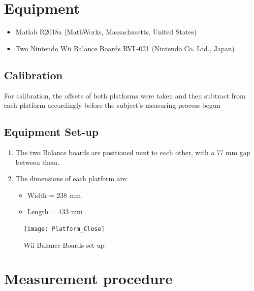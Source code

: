 \documentclass[twoside]{ctuthesis}
\theoremstyle{plain}
\theoremstyle{definition}
\theoremstyle{note}
\begin{document}
\section{Equipment}

\begin{itemize}
	\item Matlab R2018a (MathWorks, Massachusetts, United States)
	\item Two Nintendo Wii Balance Boards RVL-021 (Nintendo Co. Ltd., Japan)
\end{itemize}

\subsection{Calibration}
For calibration, the offsets of both platforms were taken and then subtract from each platform accordingly before the subject's measuring process begun
\pagebreak
\subsection{Equipment Set-up}
\begin{enumerate}
	\item The two Balance boards are positioned next to each other, with a 77 mm gap between them. 
	\item The dimensions of each platform are:
	\begin{itemize}
		\item Width = 238 mm
		\item Length = 433 mm
	\end{itemize}
\end{enumerate}

\begin{figure}[H]
	\centering
	\texttt{[image: Platform\_Close]}
	\caption{Wii Balance Boards set up}
\end{figure}


\section{Measurement procedure}
\end{document}
